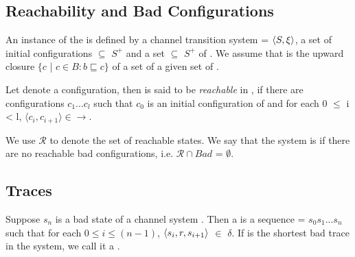 \subsection{Reachability and Bad Configurations}
\label{bad}
An instance of the  is defined by a channel transition system  = $\langle S,\xi\rangle$, a set of initial configurations  $\subseteq$ $S^+$ and a set  $\subseteq$ $S^+$ of . We assume that  is the upward closure $\{c$ | $ c \in B: b \sqsubseteq c\}$ of a set of a given  set of . 

Let  denote a configuration, then  is said to be \emph{reachable} in , if there are configurations $c_1...c_l$ such that $c_0$ is an initial configuration of  and for each 0 $\leq$ i < l, $\langle c_i, c_{i+1} \rangle \in \rightarrow$.

We use $\mathcal{R}$ to denote the set of reachable states. We say that the system  is  if there are no reachable bad configurations, i.e. $\mathcal{R} \cap Bad$ = $\emptyset$.

\subsection{Traces}
\label{traces}

Suppose $s_n$ is a bad state of a channel system . Then a  is a sequence  = $s_0s_1...s_n$ such that for each $0 \leq i \leq (n-1)$, $\langle s_i,r,s_{i+1}\rangle$ $\in$ $\delta$. If  is the shortest bad trace in the system, we call it a .

